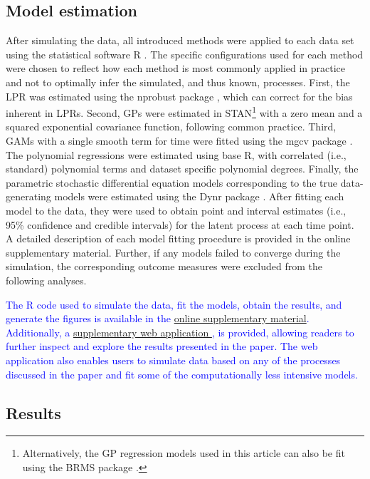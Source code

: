 \documentclass[man, floatsintext]{apa7}
\begin{document}
\subsection{Model estimation}

After simulating the data, all introduced methods were applied to each data set
using the statistical software R \parencite{R-base}. The specific
configurations used for each method were chosen to reflect how each method is
most commonly applied in practice and not to optimally infer the simulated, and
thus known, processes. First, the LPR was estimated using the nprobust package
\parencite{R-nprobust}, which can correct for the bias inherent in LPRs.
Second, GPs were estimated in STAN\footnote{Alternatively, the GP regression
  models used in this article can also be fit using the BRMS package
  \parencite{R-brms}.}
\parencite{R-cmdstanr} with a zero mean and a squared exponential covariance
function, following common practice. Third, GAMs with a single smooth term for
time were fitted using the mgcv package \parencite{R-mgcv_a}. The polynomial
regressions were estimated using base R, with correlated (i.e., standard)
polynomial terms and dataset specific polynomial degrees. Finally, the
parametric stochastic differential equation models corresponding to the true
data-generating models were estimated using the Dynr package
\parencite{R-dynr}. After fitting each model to the data, they were used to
obtain point and interval estimates (i.e., 95\% confidence and credible
intervals) for the latent process at each time point. A detailed description of
each model fitting procedure is provided in the online supplementary material.
Further, if any models failed to converge during the simulation, the
corresponding outcome measures were excluded from the following analyses.

\textcolor{blue}{
  The R code used to simulate the data, fit the models, obtain
  the results, and generate the figures is available in the
  \href{https://osf.io/3ytdx/}{online supplementary material}. Additionally, a
  \href{https://jan-ian-failenschmid.shinyapps.io/modeling_non_linearity_app/}{
    supplementary web application }, is provided, allowing readers to further
  inspect and explore the results presented in the paper. The web application
  also enables users to simulate data based on any of the processes discussed
  in
  the paper and fit some of the computationally less intensive models.
}

\subsection{Results}
\end{document}
